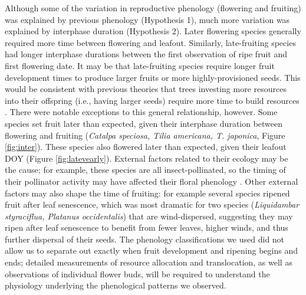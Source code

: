 \documentclass{article}
\begin{document}
\par Although some of the variation in reproductive phenology (flowering and fruiting) was explained by previous phenology (Hypothesis 1), much more variation was explained by interphase duration (Hypothesis 2). Later flowering species generally required more time between flowering and leafout. Similarly, late-fruiting species had longer interphase durations between the first observation of ripe fruit and first flowering date. It may be that late-fruiting species require longer fruit development times to produce larger fruits or more highly-provisioned seeds. This would be consistent with previous theories that trees investing more resources into their offspring (i.e., having larger seeds) require more time to build resources \citep{bolmgren2008,sun2011}. There were notable exceptions to this general relationship, however. Some species set fruit later than expected, given their interphase duration between flowering and fruiting (\textit{Catalpa speciosa, Tilia americana, T. japonica}, Figure \ref{fig:inter}). These species also flowered later than expected, given their leafout DOY (Figure \ref{fig:latevearly}). External factors related to their ecology may be the cause; for example, these species are all insect-pollinated, so the timing of their pollinator activity may have affected their floral phenology \citep{elzinga2007}. Other external factors may also shape the time of fruiting: for example several species ripened fruit after leaf senescence, which was most dramatic for two species (\emph{Liquidambar styraciflua, Platanus occidentalis}) that are wind-dispersed, suggesting they may ripen after leaf senescence to benefit from fewer leaves, higher winds, and thus further dispersal of their seeds. The phenology classifications we used did not allow us to separate out exactly when fruit development and ripening begins and ends; detailed measurements of resource allocation and translocation, as well as  observations of individual flower buds, will be required to understand the physiology underlying the phenological patterns we observed. 
\end{document}
